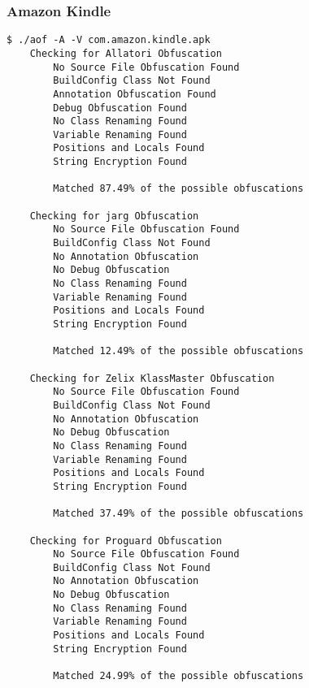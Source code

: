 \subsubsection{Amazon Kindle \cite{akindle}}
\label{app:amazon}
\begin{lstlisting}
$ ./aof -A -V com.amazon.kindle.apk
    Checking for Allatori Obfuscation
        No Source File Obfuscation Found
        BuildConfig Class Not Found
        Annotation Obfuscation Found
        Debug Obfuscation Found
        No Class Renaming Found
        Variable Renaming Found
        Positions and Locals Found
        String Encryption Found

        Matched 87.49% of the possible obfuscations

    Checking for jarg Obfuscation
        No Source File Obfuscation Found
        BuildConfig Class Not Found
        No Annotation Obfuscation
        No Debug Obfuscation
        No Class Renaming Found
        Variable Renaming Found
        Positions and Locals Found
        String Encryption Found

        Matched 12.49% of the possible obfuscations

    Checking for Zelix KlassMaster Obfuscation
        No Source File Obfuscation Found
        BuildConfig Class Not Found
        No Annotation Obfuscation
        No Debug Obfuscation
        No Class Renaming Found
        Variable Renaming Found
        Positions and Locals Found
        String Encryption Found

        Matched 37.49% of the possible obfuscations

    Checking for Proguard Obfuscation
        No Source File Obfuscation Found
        BuildConfig Class Not Found
        No Annotation Obfuscation
        No Debug Obfuscation
        No Class Renaming Found
        Variable Renaming Found
        Positions and Locals Found
        String Encryption Found

        Matched 24.99% of the possible obfuscations
\end{lstlisting}
\newpage
